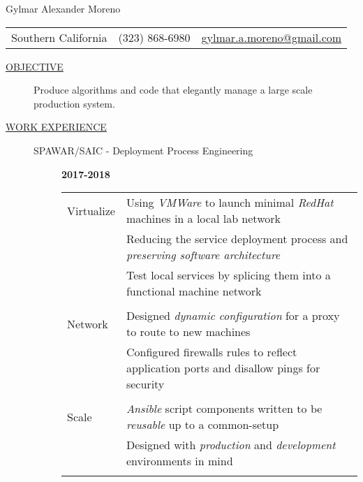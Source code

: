 \documentclass[12pt]{article}
\begin{document}
    \begin{center}
        {\LARGE Gylmar Alexander Moreno}
	\\
        \begin{tabular}{l|l|l}
            Southern California & (323) 868-6980 &
            \href{mailto:gylmar.a.moreno@gmail.com}{gylmar.a.moreno@gmail.com}
        \end{tabular}
    \end{center}

    \begin{description}
        \item[\underline{OBJECTIVE}] Produce algorithms and code that elegantly manage a large scale production system.
            \iffalse Produce algorithms and code that elegantly manage a large scale production system that\fi
        \item[\underline{WORK EXPERIENCE}] \hfill
            \begin{description}
                \item[SPAWAR/SAIC - Deployment Process Engineering] \hfill \textbf{2017-2018}\\
                    \begin{tabular}{l|l}
				    \\[-1.0mm]
			Virtualize & Using \textit{VMWare} to launch minimal \textit{RedHat} machines in a local lab network\\
				   & Reducing the service deployment process and \textit{preserving software architecture}\\
				   & Test local services by splicing them into a functional machine network\\
				    \\[-1.7mm]
			Network	   & Designed \textit{dynamic configuration} for a proxy to route to new machines\\
				   & Configured firewalls rules to reflect application ports and disallow pings for security\\
				    \\[-1.7mm]
			Scale	   & \textit{Ansible} script components written to be \textit{reusable} up to a common-setup\\
				   & Designed with \textit{production} and \textit{development} environments in mind\\
				    \\[-1.0mm]
                    \end{tabular}


\end{description}
\end{description}
\end{document}
